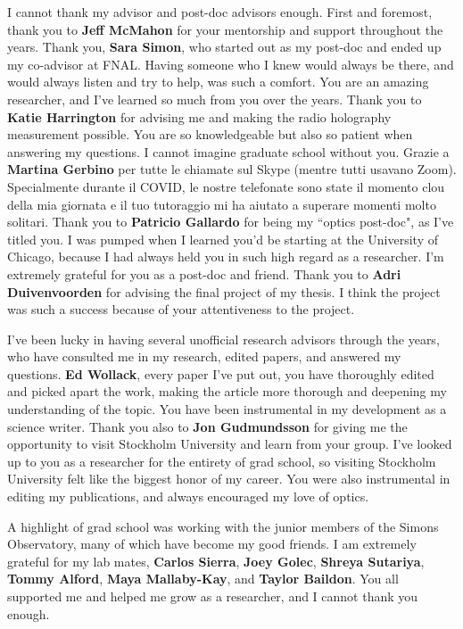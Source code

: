 \documentclass{ucetd}
\begin{document}
I cannot thank my advisor and post-doc advisors enough.  First and foremost, thank you to \textbf{Jeff McMahon} for your mentorship and support throughout the years.  Thank you, \textbf{Sara Simon}, who started out as my post-doc and ended up my co-advisor at FNAL.  Having someone who I knew would always be there, and would always listen and try to help, was such a comfort.  You are an amazing researcher, and I've learned so much from you over the years.  Thank you to \textbf{Katie Harrington} for advising me and making the radio holography measurement possible.  You are so knowledgeable but also so patient when answering my questions.  I cannot imagine graduate school without you.  Grazie a \textbf{Martina Gerbino} per tutte le chiamate sul Skype (mentre tutti usavano Zoom).  Specialmente durante il COVID, le nostre telefonate sono state il momento clou della mia giornata e il tuo tutoraggio mi ha aiutato a superare momenti molto solitari.  Thank you to \textbf{Patricio Gallardo} for being my ``optics post-doc", as I've titled you.  I was pumped when I learned you'd be starting at the University of Chicago, because I had always held you in such high regard as a researcher.  I'm extremely grateful for you as a post-doc and friend.  Thank you to \textbf{Adri Duivenvoorden} for advising the final project of my thesis.  I think the project was such a success because of your attentiveness to the project.

I've been lucky in having several unofficial research advisors through the years, who have consulted me in my research, edited papers, and answered my questions.  \textbf{Ed Wollack}, every paper I've put out, you have thoroughly edited and picked apart the work, making the article more thorough and deepening my understanding of the topic.  You have been instrumental in my development as a science writer.  Thank you also to \textbf{Jon Gudmundsson} for giving me the opportunity to visit Stockholm University and learn from your group.  I've looked up to you as a researcher for the entirety of grad school, so visiting Stockholm University felt like the biggest honor of my career.  You were also instrumental in editing my publications, and always encouraged my love of optics.

A highlight of grad school was working with the junior members of the Simons Observatory, many of which have become my good friends.  I am extremely grateful for my lab mates, \textbf{Carlos Sierra}, \textbf{Joey Golec}, \textbf{Shreya Sutariya}, \textbf{Tommy Alford}, \textbf{Maya Mallaby-Kay}, and \textbf{Taylor Baildon}.  You all supported me and helped me grow as a researcher, and I cannot thank you enough.
\end{document}
